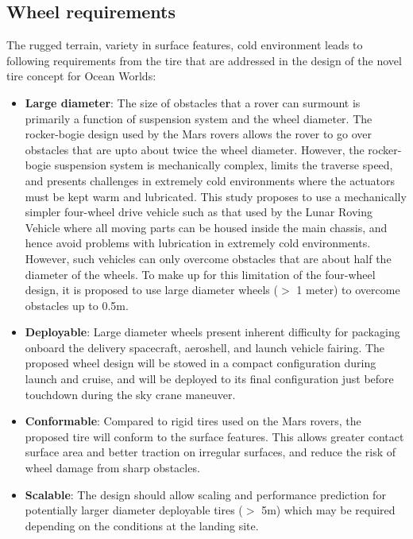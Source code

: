 \documentclass{article}
\begin{document}
\subsection{Wheel requirements}
The rugged terrain, variety in surface features, cold environment leads to following requirements from the tire that are addressed in the design of the novel tire concept for Ocean Worlds:
\begin{itemize}
    \item \textbf{Large diameter}: The size of obstacles that a rover can surmount is primarily a function of suspension system and the wheel diameter. The rocker-bogie design used by the Mars rovers allows the rover to go over obstacles that are upto about twice the wheel diameter. However, the rocker-bogie suspension system is mechanically complex, limits the traverse speed, and presents challenges in extremely cold environments where the actuators must be kept warm and lubricated. This study proposes to use a mechanically simpler four-wheel drive vehicle such as that used by the Lunar Roving Vehicle where all moving parts can be housed inside the main chassis, and hence avoid problems with lubrication in extremely cold environments. However, such vehicles can only overcome obstacles that are about half the diameter of the wheels. To make up for this limitation of the four-wheel design, it is proposed to use large diameter wheels ($>$ 1 meter) to overcome obstacles up to 0.5m. 
    \item \textbf{Deployable}: Large diameter wheels present inherent difficulty for packaging onboard the delivery spacecraft, aeroshell, and launch vehicle fairing. The proposed wheel design will be stowed in a compact configuration during launch and cruise, and will be deployed to its final configuration just before touchdown during the sky crane maneuver.
    
    \item \textbf{Conformable}: Compared to rigid tires used on the Mars rovers, the proposed tire will conform to the surface features. This allows greater contact surface area and better traction on irregular surfaces, and reduce the risk of wheel damage from sharp obstacles.     
    
    
    \item \textbf{Scalable}: The design should allow scaling and performance prediction for potentially larger diameter deployable tires ($>$ 5m) which may be required depending on the conditions at the landing site.
    

\end{itemize}
\end{document}
